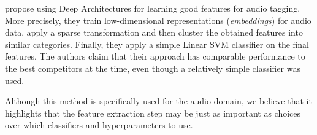 \cite{sattigeri_etal_2014} propose using Deep Architectures for learning good features for audio tagging. More precisely, they train low-dimensional representations (\textit{embeddings}) for audio data, apply a sparse transformation and then cluster the obtained features into similar categories. Finally, they apply a simple Linear SVM classifier on the final features. The authors claim that their approach has comparable performance to the best competitors at the time, even though a relatively simple classifier was used.

Although this method is specifically used for the audio domain, we believe that it highlights that the feature extraction step may be just as important as choices over which classifiers and hyperparameters to use.